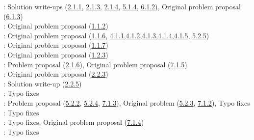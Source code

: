 \Paiya: Solution write-ups (\hyperref[2-1-1]{2.1.1}, \hyperref[2-1-3]{2.1.3}, \hyperref[2-1-4]{2.1.4}, \hyperref[5-1-4]{5.1.4}, \hyperref[6-1-2]{6.1.2}), Original problem proposal (\hyperref[6-1-3]{6.1.3}) \\
\Ptony: Original problem proposal (\hyperref[1-1-2]{1.1.2})\\
\Ppi: Original problem proposal (\hyperref[1-1-6]{1.1.6}, \hyperref[4-1-1]{4.1.1},\hyperref[4-1-2]{4.1.2},\hyperref[4-1-3]{4.1.3},\hyperref[4-1-4]{4.1.4},\hyperref[4-1-5]{4.1.5}, \hyperref[5-2-5]{5.2.5})\\
\Pbfan: Original problem proposal (\hyperref[1-1-7]{1.1.7})\\
\Pkiesh: Original problem proposal (\hyperref[1-2-3]{1.2.3})\\
\Pchris: Problem proposal (\hyperref[2-1-6]{2.1.6}), Original problem proposal (\hyperref[7-1-5]{7.1.5})\\
\Pkee: Original problem proposal (\hyperref[2-2-3]{2.2.3})\\
\PSlas: Solution write-up (\hyperref[2-2-5]{2.2.5})\\
\Parjun: Typo fixes\\
\Pnjoy: Problem proposal (\hyperref[5-2-2]{5.2.2}, \hyperref[5-2-4]{5.2.4}, \hyperref[7-1-3]{7.1.3}), Original problem (\hyperref[5-2-3]{5.2.3}, \hyperref[7-1-2]{7.1.2}), Typo fixes\\
\Paops: Typo fixes\\
\Phobo: Typo fixes, Original problem proposal (\hyperref[7-1-4]{7.1.4})\\
\Pradical: Typo fixes\\